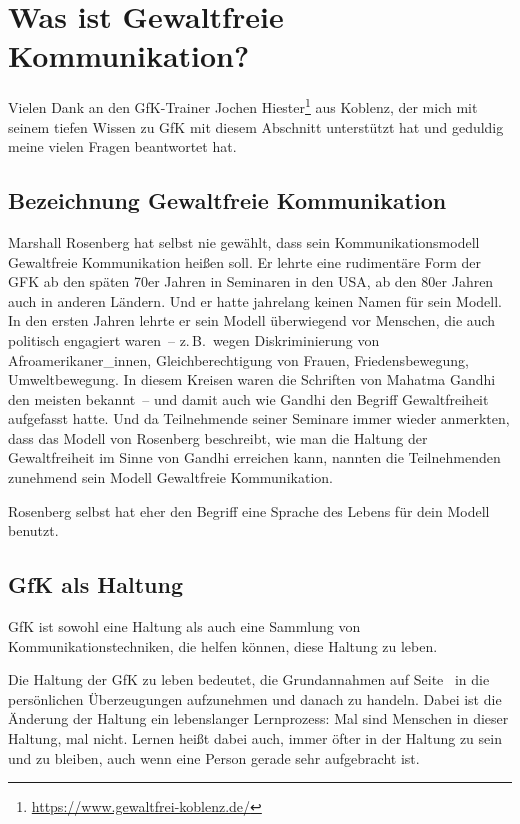 \section{Was ist Gewaltfreie Kommunikation?}

Vielen Dank an den GfK-Trainer Jochen Hiester\footnote{\url{https://www.gewaltfrei-koblenz.de/}} aus Koblenz, der mich mit seinem tiefen Wissen zu GfK mit diesem Abschnitt unterstützt hat und geduldig meine vielen Fragen beantwortet hat.

\subsection{Bezeichnung \glqq Gewaltfreie Kommunikation\grqq}

Marshall Rosenberg hat selbst nie gewählt, dass sein Kommunikationsmodell Gewaltfreie Kommunikation heißen soll. Er lehrte eine rudimentäre Form der GFK ab den späten 70er Jahren in Seminaren in den USA, ab den 80er Jahren auch in anderen Ländern. Und er hatte jahrelang keinen Namen für sein Modell. In den ersten Jahren lehrte er sein Modell überwiegend vor Menschen, die auch politisch engagiert waren~-- z.\,B.~wegen Diskriminierung von Afroamerikaner\_innen, Gleichberechtigung von Frauen, Friedensbewegung, Umweltbewegung. In diesem Kreisen waren die Schriften von Mahatma Gandhi den meisten bekannt~-- und damit auch wie Gandhi den Begriff \glqq Gewaltfreiheit\grqq{} aufgefasst hatte. Und da Teilnehmende seiner Seminare immer wieder anmerkten, dass das Modell von Rosenberg beschreibt, wie man die Haltung der Gewaltfreiheit im Sinne von Gandhi erreichen kann, nannten die Teilnehmenden zunehmend sein Modell \glqq Gewaltfreie Kommunikation\grqq.

Rosenberg selbst hat eher den Begriff \glqq eine Sprache des Lebens\grqq{} für dein Modell benutzt.

\subsection{GfK als Haltung}
\label{gfk-haltung}

GfK ist sowohl eine Haltung als auch eine Sammlung von Kommunikationstechniken, die helfen können, diese Haltung zu leben.

Die Haltung der GfK zu leben bedeutet, die Grundannahmen auf Seite~\pageref{gfk-annahmen} in die persönlichen Überzeugungen aufzunehmen und danach zu handeln. Dabei ist die Änderung der Haltung ein lebenslanger Lernprozess: Mal sind Menschen in dieser Haltung, mal nicht. Lernen heißt dabei auch, immer öfter in der Haltung zu sein und zu bleiben, auch wenn eine Person gerade sehr aufgebracht ist.

